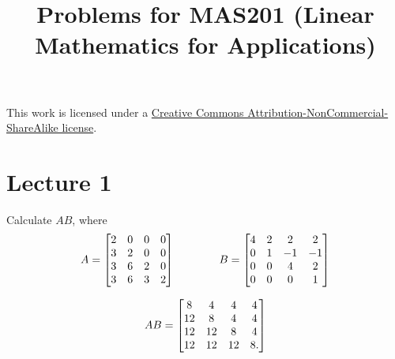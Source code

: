 \documentclass[a4paper]{amsart}
\title{Problems for MAS201 (Linear Mathematics for Applications)}
\renewenvironment{solution}{\SolutionInline}{\endSolutionInline}
\begin{document}
\maketitle

\begin{center}
 This work is licensed under a 
 \href{https://creativecommons.org/licenses/by-nc-sa/3.0/deed.en}{
  Creative Commons Attribution-NonCommercial-ShareAlike license}.
 
 \bigskip

 \doclicenseImage 
\end{center}

\newpage

\section{Lecture 1}

\begin{exercise}\label{ex-mat-prod-i}
 Calculate $AB$, where 
 \[ A = \left[\begin{matrix} 2&0&0&0 \\ 3&2&0&0 \\ 3&6&2&0 \\ 3&6&3&2 \end{matrix}\right] 
    \hspace{4em}
    B = \left[\begin{matrix} 4&2&2&2 \\ 0&1&-1&-1 \\ 0&0&4&2 \\ 0&0&0&1 \end{matrix}\right]
 \]
\end{exercise}
\begin{solution}
 \[ AB = \left[\begin{matrix}  8 &  4 &  4 &  4 \\
              12 &  8 &  4 &  4 \\
              12 & 12 &  8 &  4 \\
              12 & 12 & 12 &  8.
         \end{matrix}\right] 
 \]
\end{solution}
\end{document}
